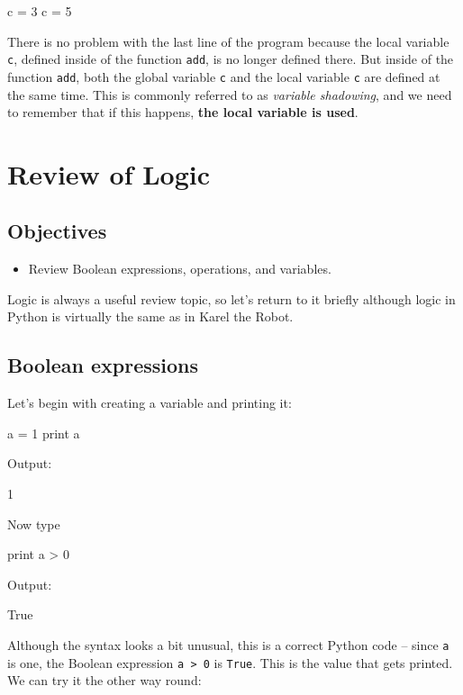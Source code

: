 \begin{bluecode}
c = 3
c = 5
\end{bluecode}
There is no 
problem with the last line of the program because the local variable {\tt c}, defined
inside of the function {\tt add}, is no longer defined there. But inside of the function
{\tt add}, both the global variable {\tt c} and the local variable {\tt c} are defined at 
the same time. This is commonly referred to as {\em variable shadowing}, and we need to 
remember that if this happens, {\bf the local variable is used}.


\section{Review of Logic}

\subsection{Objectives}

\begin{itemize}
\item Review Boolean expressions, operations, and variables.
\end{itemize}
Logic is always a useful review topic, so let's return to it briefly although logic in Python is 
virtually the same as in Karel the Robot.

\subsection{Boolean expressions}

Let's begin with creating a variable 
and printing it:

\begin{bluecode}
a = 1
print a
\end{bluecode}
Output:

\begin{bluecode}
1
\end{bluecode}
Now type

\begin{bluecode}
print a > 0
\end{bluecode}
Output:

\begin{bluecode}
True
\end{bluecode}
Although the syntax looks a bit unusual, this is a correct
Python code -- since {\tt a} is one, the Boolean expression {\tt a > 0}
is {\tt True}. This is the value that gets printed. We can try it the other 
way round:

